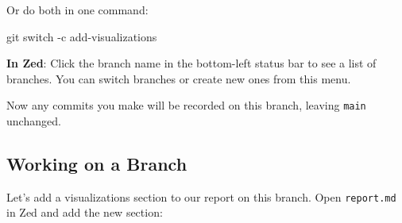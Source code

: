 \documentclass[
  letterpaper,
  DIV=11,
  numbers=noendperiod]{scrreprt}
\newenvironment{Shaded}{\begin{snugshade}}{\end{snugshade}}
\newcommand{\AttributeTok}[1]{\textcolor[rgb]{0.40,0.45,0.13}{#1}}
\newcommand{\FunctionTok}[1]{\textcolor[rgb]{0.28,0.35,0.67}{#1}}
\newcommand{\NormalTok}[1]{\textcolor[rgb]{0.00,0.23,0.31}{#1}}
\begin{document}
Or do both in one command:

\begin{codelisting}

\caption{\texttt{terminal}}

\begin{Shaded}
\begin{Highlighting}[]
\FunctionTok{git}\NormalTok{ switch }\AttributeTok{{-}c}\NormalTok{ add{-}visualizations}
\end{Highlighting}
\end{Shaded}

\end{codelisting}

\textbf{In Zed}: Click the branch name in the bottom-left status bar to
see a list of branches. You can switch branches or create new ones from
this menu.

Now any commits you make will be recorded on this branch, leaving
\texttt{main} unchanged.

\subsection{Working on a Branch}\label{working-on-a-branch}

Let's add a visualizations section to our report on this branch. Open
\texttt{report.md} in Zed and add the new section:
\end{document}
